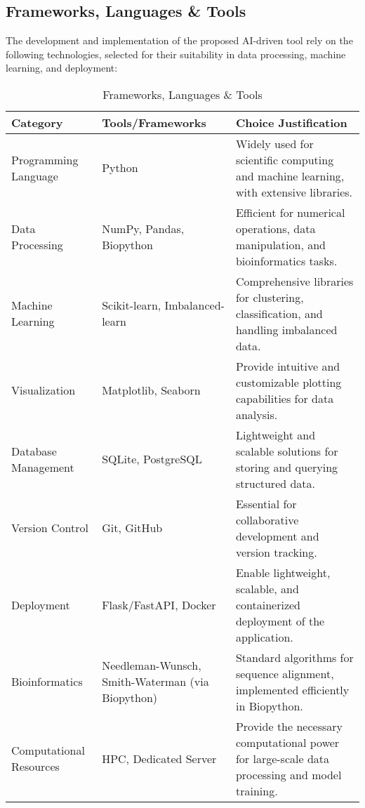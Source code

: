 \subsection{Frameworks, Languages \& Tools}
The development and implementation of the proposed AI-driven tool rely on the following technologies, selected for their suitability in data processing, machine learning, and deployment:

\begin{table}[h]
\centering
\caption{Frameworks, Languages \& Tools}
\label{tab:frameworks}
\begin{tabular}{|p{3.5cm}|p{3.5cm}|p{6cm}|}
\hline
\textbf{Category} & \textbf{Tools/Frameworks} & \textbf{Choice Justification} \\ \hline
Programming Language & Python & Widely used for scientific computing and machine learning, with extensive libraries. \\ \hline
Data Processing & NumPy, Pandas, Biopython & Efficient for numerical operations, data manipulation, and bioinformatics tasks. \\ \hline
Machine Learning & Scikit-learn, Imbalanced-learn & Comprehensive libraries for clustering, classification, and handling imbalanced data. \\ \hline
Visualization & Matplotlib, Seaborn & Provide intuitive and customizable plotting capabilities for data analysis. \\ \hline
Database Management & SQLite, PostgreSQL & Lightweight and scalable solutions for storing and querying structured data. \\ \hline
Version Control & Git, GitHub & Essential for collaborative development and version tracking. \\ \hline
Deployment & Flask/FastAPI, Docker & Enable lightweight, scalable, and containerized deployment of the application. \\ \hline
Bioinformatics & Needleman-Wunsch, Smith-Waterman (via Biopython) & Standard algorithms for sequence alignment, implemented efficiently in Biopython. \\ \hline
Computational Resources & HPC, Dedicated Server & Provide the necessary computational power for large-scale data processing and model training. \\ \hline
\end{tabular}
\end{table}


